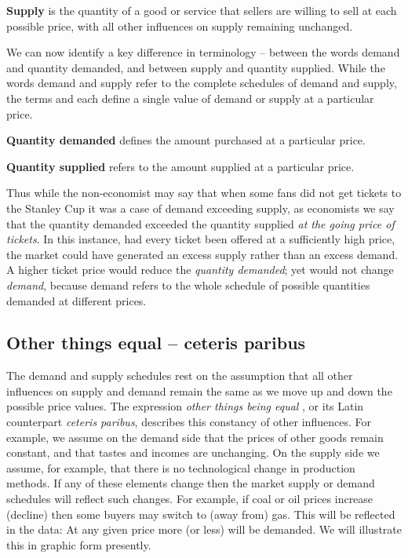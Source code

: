 \begin{DefBox}
\textbf{Supply} is the quantity of a good or service that sellers are willing to sell at each possible price, with all other influences on supply remaining unchanged.
\end{DefBox}

We can now identify a key difference in terminology -- between the words
demand and quantity demanded, and between supply and quantity supplied.
While the words demand and supply refer to the complete schedules of demand
and supply, the terms  and %
 each define a single value of demand or
supply at a particular price.

\begin{DefBox}
\textbf{Quantity demanded} defines the amount purchased at a particular price.

\textbf{Quantity supplied} refers to the amount supplied at a particular price.
\end{DefBox}

Thus while the non-economist may say that when some fans did not get tickets
to the Stanley Cup it was a case of demand exceeding supply, as economists
we say that the quantity demanded exceeded the quantity supplied \textit{at
the going price of tickets}. In this instance, had every ticket been offered
at a sufficiently high price, the market could have generated an excess
supply rather than an excess demand. A higher ticket price would reduce the 
\textit{quantity demanded}; yet would not change \textit{demand}, because
demand refers to the whole schedule of possible quantities demanded at
different prices.

\newhtmlpage

\subsection*{Other things equal -- ceteris paribus}

The demand and supply schedules rest on the assumption that all other
influences on supply and demand remain the same as we move up and down the
possible price values. The expression \textit{other things being equal%
}, or its Latin counterpart \textit{ceteris paribus}, describes this
constancy of other influences. For example, we assume on the demand side
that the prices of other goods remain constant, and that tastes and incomes are
unchanging. On the supply side we assume, for example, that there is no
technological change in production methods. If any of these elements change
then the market supply or demand schedules will reflect such changes. For
example, if coal or oil prices increase (decline) then some buyers may switch
to (away from) gas. This will be reflected in the data: At any given price
more (or less) will be demanded. We will illustrate this in graphic form
presently.

